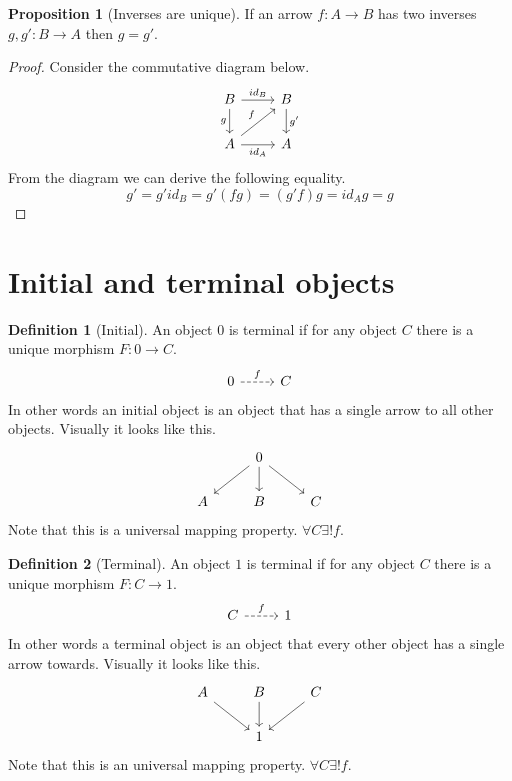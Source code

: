 \documentclass{book}
\theoremstyle{definition}
\newtheorem{definition}{Definition}[section]
\newtheorem{proposition}{Proposition}
\newcommand{\arr}[3]{#1 : #2 \rightarrow #3}
\newcommand\id{\mathit{id}}
\begin{document}
\begin{proposition}[Inverses are unique]
  If an arrow $\arr{f}{A}{B}$ has two inverses $\arr{g, g'}{B}{A}$ then $g =
  g'$.
\end{proposition}
\begin{proof}
  Consider the commutative diagram below.
  \[
    \begin{tikzcd}
      B \arrow[r, "id_B"] \arrow[d, "g"'] & B \arrow[d, "g'"] \\
      A \arrow[r, "id_A"'] \arrow[ru, "f"] & A
    \end{tikzcd}
  \]
  From the diagram we can derive the following equality.
  \[
    g' = g' \id_B = g' (f g) = (g' f) g = \id_A g = g
  \]
\end{proof}

\section{Initial and terminal objects}

\begin{definition}[Initial]
  An object $0$ is terminal if for any object $C$ there is a unique morphism
  $\arr{F}{0}{C}$.
  \[
    \begin{tikzcd}
      0 \arrow[r, dashrightarrow, "f"] & C
    \end{tikzcd}
  \]
  In other words an initial object is an object that has a single arrow to all
  other objects. Visually it looks like this.
  \[
    \begin{tikzcd}
      & 0 \arrow[ld] \arrow[d] \arrow[rd] \\
      A & B & C
    \end{tikzcd}
  \]
  Note that this is a universal mapping property. $\forall C \exists! f$.
\end{definition}

\begin{definition}[Terminal]
  An object $1$ is terminal if for any object $C$ there is a unique morphism
  $\arr{F}{C}{1}$.
  \[
    \begin{tikzcd}
      C \arrow[r, dashrightarrow, "f"] & 1
    \end{tikzcd}
  \]
  In other words a terminal object is an object that every other object has a
  single arrow towards. Visually it looks like this.
  \[
    \begin{tikzcd}
      A \arrow[rd] & B \arrow[d] & C \arrow[ld] \\
      & 1
    \end{tikzcd}
  \]
  Note that this is an universal mapping property. $\forall C \exists! f$.
\end{definition}
\end{document}
